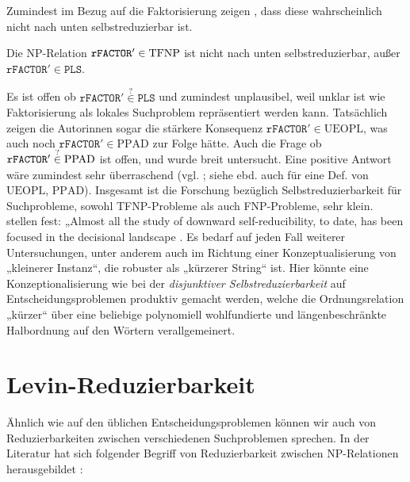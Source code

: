 Zumindest im Bezug auf die Faktorisierung zeigen \citeauthor{harsha_downward_2023}, dass diese wahrscheinlich nicht nach unten selbstreduzierbar ist.
\begin{theorem}
    Die NP-Relation $\mathtt{rFACTOR}'\in\mathrm{TFNP}$ ist nicht nach unten selbstreduzierbar, außer $\mathtt{rFACTOR}'\in\mathtt{PLS}$.
\end{theorem}
Es ist offen ob $\mathtt{rFACTOR}'\stackrel{?}{\in}\mathtt{PLS}$ und zumindest unplausibel, weil unklar ist wie Faktorisierung als lokales Suchproblem repräsentiert werden kann.
Tatsächlich zeigen die Autorinnen sogar die stärkere Konsequenz $\mathtt{rFACTOR}'\in\mathrm{UEOPL}$, was auch noch $\mathtt{rFACTOR}'\in\mathrm{PPAD}$ zur Folge hätte. Auch die Frage ob $\mathtt{rFACTOR}'\stackrel{\smash ?}{\in}\mathrm{PPAD}$ ist offen, und wurde breit untersucht. Eine positive Antwort wäre zumindest sehr überraschend (vgl. \cite[67:15]{harsha_downward_2023}; siehe ebd. auch für eine Def. von $\mathrm{UEOPL}$, $\mathrm{PPAD}$).\label{page:self-reducibility}
Insgesamt ist die Forschung bezüglich Selbstreduzierbarkeit für Suchprobleme, sowohl TFNP-Probleme als auch FNP-Probleme, sehr klein. \citeauthor{harsha_downward_2023} stellen fest: „\foreignlanguage{english}{Almost all the study of downward self-reducibility, to date, has been focused in the decisional landscape} \textcite*{harsha_downward_2023}. 
Es bedarf auf jeden Fall weiterer Untersuchungen, unter anderem auch im Richtung einer Konzeptualisierung von „kleinerer Instanz“, die robuster als „kürzerer String“ ist. Hier könnte eine Konzeptionalisierung wie bei der \emph{disjunktiver Selbstreduzierbarkeit} auf Entscheidungsproblemen \parencites(vgl.)(){meyer_frequency_1979}{balcazar_self_1989}{selman_natural_1988}[Abschn. 9.5]{wechsung_vorlesungen_2000} produktiv gemacht werden, welche die Ordnungsrelation „kürzer“ über eine beliebige polynomiell wohlfundierte und längenbeschränkte Halbordnung auf den Wörtern verallgemeinert.

\section{Levin-Reduzierbarkeit}\label{sec:levin}

Ähnlich wie auf den üblichen Entscheidungsproblemen können wir auch von Reduzierbarkeiten zwischen verschiedenen Suchproblemen sprechen. In der Literatur hat sich folgender Begriff von Reduzierbarkeit zwischen NP-Relationen herausgebildet \parencites(vgl.)()[229]{papadimitriou_computational_1994}[61]{goldreich_computational_2008}[50]{arora_computational_2009}:

